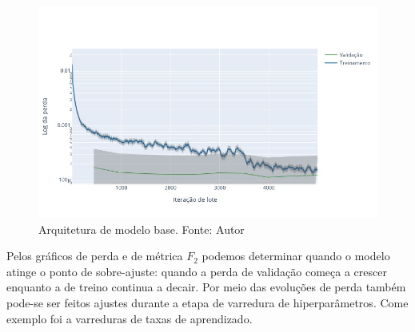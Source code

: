 \begin{figure}[!ht]
    \centering
    \includegraphics[width=\columnwidth]{Imagens/results/rsp-swin-t_planet_pt/Training Loss Per Minibatch.jpg}
    \caption{ Arquitetura de modelo base. Fonte: Autor}
    \label{fig:LossTrainSwin}
\end{figure}


Pelos gráficos de perda e de métrica $F_2$ podemos determinar quando o modelo atinge o ponto de sobre-ajuste: quando a perda de validação começa a crescer enquanto a de treino continua a decair. Por meio das evoluções de perda também pode-se ser feitos ajustes durante a etapa de varredura de hiperparâmetros. Come exemplo foi a varreduras de taxas de aprendizado.